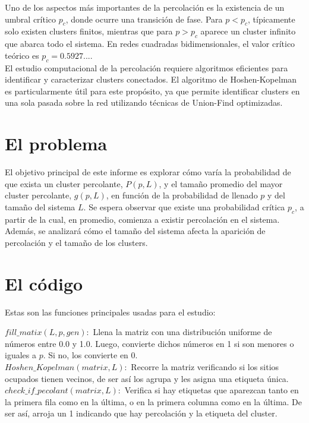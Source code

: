 \documentclass[10pt,twocolumn]{article}
\begin{document}
    Uno de los aspectos más importantes de la percolación es la existencia de un umbral crítico $p_c$, donde ocurre una transición de fase. 
    Para $p < p_c$, típicamente solo existen clusters finitos, mientras que para $p > p_c$ aparece un cluster infinito que abarca todo el 
    sistema. En redes cuadradas bidimensionales, el valor crítico teórico es $p_c = 0.5927...$.\\

    El estudio computacional de la percolación requiere algoritmos eficientes para identificar y caracterizar clusters conectados. El 
    algoritmo de Hoshen-Kopelman \cite{hoshen1976percolation} es particularmente útil para este propósito, ya que permite identificar 
    clusters en una sola pasada sobre la red utilizando técnicas de Union-Find optimizadas.\\
    
\section{El problema}
El objetivo principal de este informe es explorar cómo varía la probabilidad de que exista un cluster percolante, 
\( P(p, L) \), y el tamaño promedio del mayor cluster percolante, \( g(p, L) \), en función de la probabilidad de llenado \( p \) y del tamaño del sistema \( L \). Se espera observar que existe una probabilidad crítica \( p_c \), a partir de la cual, en promedio, comienza a existir percolación en el sistema. Además, se analizará cómo el tamaño del sistema afecta la aparición de percolación y el tamaño de los clusters.

    
\section{El código}
    Estas son las funciones principales usadas para el estudio:

    $fill\_matix(L, p, gen):$ Llena la matriz con una distribución uniforme de números entre 0.0 y 1.0. Luego, convierte
    dichos números en 1 si son menores o iguales a $p$. Si no, los convierte en 0.\\ 

    $Hoshen\_Kopelman(matrix, L):$ Recorre la matriz verificando si los sitios ocupados tienen vecinos, de ser así los agrupa
    y les asigna una etiqueta única.\\

    $check\_if\_pecolant(matrix, L):$ Verifica si hay etiquetas que aparezcan tanto en la primera fila como en la última, o
    en la primera columna como en la última. De ser así, arroja un 1 indicando que hay percolación y la etiqueta del cluster.\\
    
\end{document}

